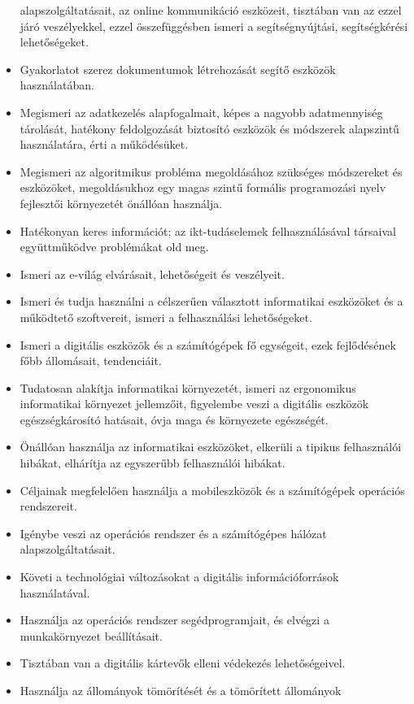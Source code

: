 \begin{itemize}
  alapszolgáltatásait, az online kommunikáció eszközeit, tisztában van
  az ezzel járó veszélyekkel, ezzel összefüggésben ismeri a
  segítségnyújtási, segítségkérési lehetőségeket.
\item
  Gyakorlatot szerez dokumentumok létrehozását segítő eszközök
  használatában.
\item
  Megismeri az adatkezelés alapfogalmait, képes a nagyobb adatmennyiség
  tárolását, hatékony feldolgozását biztosító eszközök és módszerek
  alapszintű használatára, érti a működésüket.
\item
  Megismeri az algoritmikus probléma megoldásához szükséges módszereket
  és eszközöket, megoldásukhoz egy magas szintű formális programozási
  nyelv fejlesztői környezetét önállóan használja.
\item
  Hatékonyan keres információt; az ikt-tudáselemek felhasználásával
  társaival együttműködve problémákat old meg.
\item
  Ismeri az e-világ elvárásait, lehetőségeit és veszélyeit.
\item
  Ismeri és tudja használni a célszerűen választott informatikai
  eszközöket és a működtető szoftvereit, ismeri a felhasználási
  lehetőségeket.
\item
  Ismeri a digitális eszközök és a számítógépek fő egységeit, ezek
  fejlődésének főbb állomásait, tendenciáit.
\item
  Tudatosan alakítja informatikai környezetét, ismeri az ergonomikus
  informatikai környezet jellemzőit, figyelembe veszi a digitális
  eszközök egészségkárosító hatásait, óvja maga és környezete
  egészségét.
\item
  Önállóan használja az informatikai eszközöket, elkerüli a tipikus
  felhasználói hibákat, elhárítja az egyszerűbb felhasználói hibákat.
\item
  Céljainak megfelelően használja a mobileszközök és a számítógépek
  operációs rendszereit.
\item
  Igénybe veszi az operációs rendszer és a számítógépes hálózat
  alapszolgáltatásait.
\item
  Követi a technológiai változásokat a digitális információforrások
  használatával.
\item
  Használja az operációs rendszer segédprogramjait, és elvégzi a
  munkakörnyezet beállításait.
\item
  Tisztában van a digitális kártevők elleni védekezés lehetőségeivel.
\item
  Használja az állományok tömörítését és a tömörített állományok

\end{itemize}

